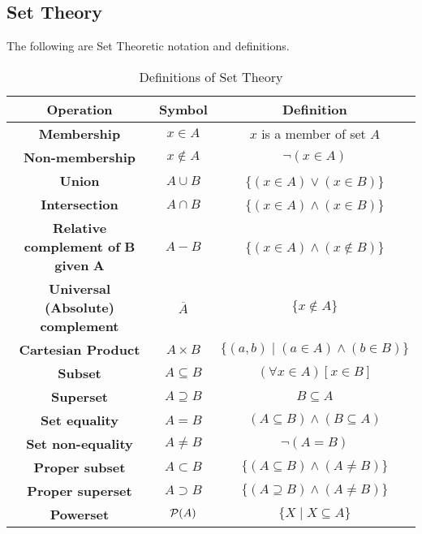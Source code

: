 \documentclass[letterpaper,12pt]{article}
\begin{document}
\pagebreak

\subsection*{Set Theory}
\label{subsec:setTheory}

The following are Set Theoretic notation and definitions.

\begin{table}[H]
	\centering
	\renewcommand*{\arraystretch}{1.4}
	\begin{tabular}{| c | c | c | } \hline 
		{\large \bf Operation} & 		{\large \bf Symbol} &  {\large \bf Definition } \\  \hline 
		\textbf{Membership} & $x \in A$ & $x$ is a member of set $A$ \\ \hline
		\textbf{Non-membership} & $x \notin A$ & $ \neg (x \in A)$ \\ \hline
		\textbf{Union} & $A \cup B$ & $\{ (x \in A) \lor (x \in B)$\}   \\ \hline
		\textbf{Intersection} & $A \cap B$ & $\{ (x \in A) \land (x \in B)$\}   \\ \hline
		\textbf{Relative complement of} $\mathbf B$ \textbf{given} $\mathbf A$ & $A - B$ & $\{ (x \in A) \land (x \notin B)$\}   \\ \hline 
		\textbf{Universal (Absolute) complement} & $\overline{A}$ & $\{x \notin A\}$\\ \hline
		\textbf{Cartesian Product} & $A \times B$ & $\{(a, b) \mid   (a \in A) \land (b \in B)  \}$ \\ \hline
		\textbf{Subset} & $A \subseteq B$ & $(\forall x \in A)[x \in B] $\\ \hline
		\textbf{Superset} & $A \supseteq B$ & $ B \subseteq A$\\ \hline
		\textbf{Set equality} & $A = B$ & $(A \subseteq B) \land (B \subseteq A) $ \\ \hline
		\textbf{Set non-equality} & $A \neq  B$ & $\neg (A =B) $ \\ \hline
		\textbf{Proper subset} & $A \subset B$ & $ \{ (A \subseteq B) \land (A \neq B) \} $ \\ \hline
		\textbf{Proper superset} & $A \supset B$ & $ \{ (A \supseteq B) \land (A \neq B) \} $ \\ \hline
		\textbf{Powerset} & $\mathcal{P}(A) $ & $ \{ X \mid X \subseteq A \} $ \\ \hline
	\end{tabular}
	\vspace{.1in}
	\caption{Definitions of Set Theory}
	\label{tbl:setTheory}
\end{table}
\end{document}
